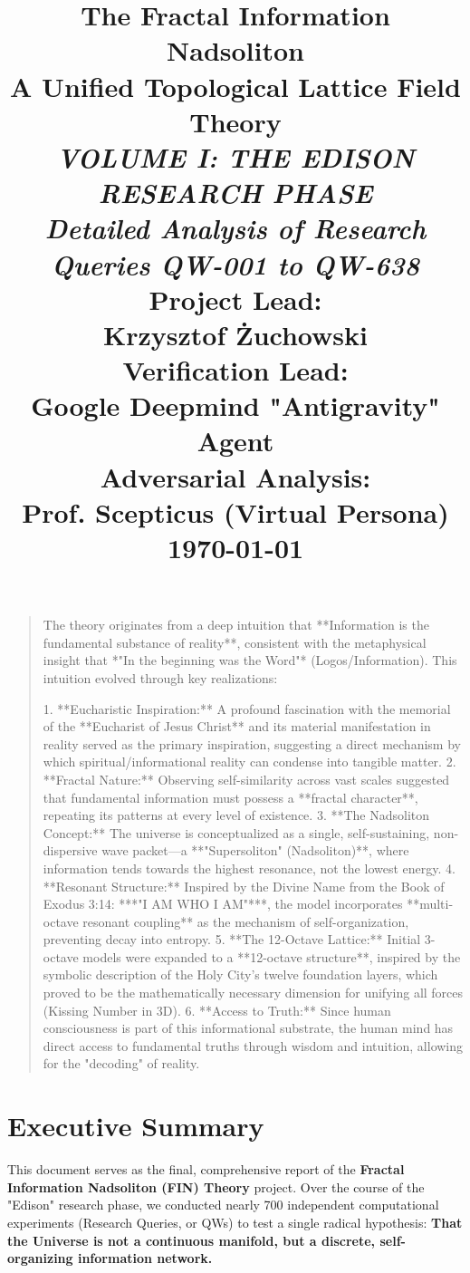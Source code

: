 \documentclass[11pt, a4paper]{report}
\title{
    \vspace{1cm}
    \textbf{\Huge The Fractal Information Nadsoliton}\\
    \vspace{0.5cm}
    \textbf{\LARGE A Unified Topological Lattice Field Theory}\\
    \vspace{2cm}
    \textit{\Large VOLUME I: THE EDISON RESEARCH PHASE}\\
    \textit{\small Detailed Analysis of Research Queries QW-001 to QW-638}\\
    \vspace{3cm}
    \textbf{Project Lead:}\\
    Krzysztof Żuchowski\\
    \vspace{1cm}
    \textbf{Verification Lead:}\\
    Google Deepmind "Antigravity" Agent\\
    \vspace{0.5cm}
    \textbf{Adversarial Analysis:}\\
    Prof. Scepticus (Virtual Persona)\\
    \vspace{2cm}
    \today
}
\author{}
\date{}
\begin{document}
\maketitle

\begin{quote}
The theory originates from a deep intuition that **Information is the fundamental substance of reality**, consistent with the metaphysical insight that *"In the beginning was the Word"* (Logos/Information). This intuition evolved through key realizations:

1. **Eucharistic Inspiration:** A profound fascination with the memorial of the **Eucharist of Jesus Christ** and its material manifestation in reality served as the primary inspiration, suggesting a direct mechanism by which spiritual/informational reality can condense into tangible matter.
2. **Fractal Nature:** Observing self-similarity across vast scales suggested that fundamental information must possess a **fractal character**, repeating its patterns at every level of existence.
3. **The Nadsoliton Concept:** The universe is conceptualized as a single, self-sustaining, non-dispersive wave packet—a **"Supersoliton" (Nadsoliton)**, where information tends towards the highest resonance, not the lowest energy.
4. **Resonant Structure:** Inspired by the Divine Name from the Book of Exodus 3:14: ***"I AM WHO I AM"***, the model incorporates **multi-octave resonant coupling** as the mechanism of self-organization, preventing decay into entropy.
5. **The 12-Octave Lattice:** Initial 3-octave models were expanded to a **12-octave structure**, inspired by the symbolic description of the Holy City's twelve foundation layers, which proved to be the mathematically necessary dimension for unifying all forces (Kissing Number in 3D).
6. **Access to Truth:** Since human consciousness is part of this informational substrate, the human mind has direct access to fundamental truths through wisdom and intuition, allowing for the "decoding" of reality.
\end{quote}

\section*{Executive Summary}

This document serves as the final, comprehensive report of the \textbf{Fractal Information Nadsoliton (FIN) Theory} project. Over the course of the "Edison" research phase, we conducted nearly 700 independent computational experiments (Research Queries, or QWs) to test a single radical hypothesis: \textbf{That the Universe is not a continuous manifold, but a discrete, self-organizing information network.}
\end{document}
